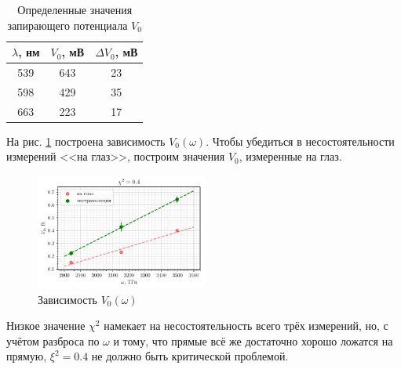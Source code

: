 \begin{table}[h!]
    \caption{Определенные значения запирающего потенциала $V_0$}
    \centering
    \begin{tabular}{ccc}
    \toprule
        $\lambda$, нм &
        $V_0$, мВ &
        $\Delta V_0$, мВ \\ 
    \midrule
        539 &  643 & 23 \\ 
        598 &  429 & 35 \\ 
        663 &  223 & 17 \\ 
    \bottomrule
    \end{tabular}
    \label{tab:res}
\end{table}

На рис. \ref{fig:V0omega} построена зависимость $V_0 (\omega)$. 
Чтобы убедиться в несостоятельности измерений <<на глаз>>, построим значения $V_0$, измеренные на глаз. 
\vspace{-3mm}

\begin{figure}[h]
    \centering
    \includegraphics[width=0.5\textwidth]{figs/fig_V0.pdf}
    \caption{Зависимость $V_0 (\omega)$}
    \label{fig:V0omega}
\end{figure}

Низкое значение $\chi^2$ намекает на несостоятельность всего трёх измерений, но, с учётом разброса по $\omega$ и тому, что прямые всё же достаточно хорошо ложатся на прямую, $\xi^2 = 0.4$ не должно быть критической проблемой. 